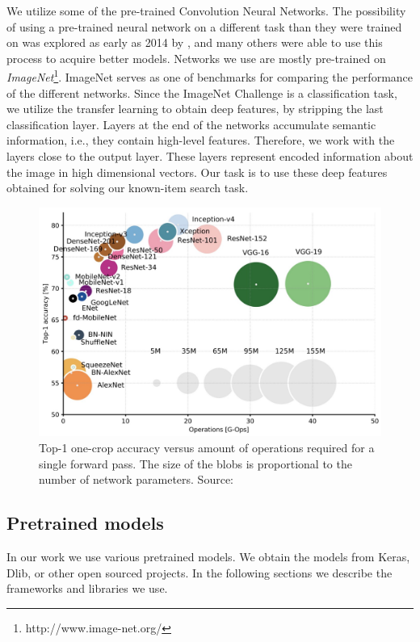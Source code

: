 We utilize some of the pre-trained Convolution Neural Networks. The possibility of using a pre-trained neural network on a different task than they were trained on was explored as early as 2014 by \cite{donahuedeep}, and many others were able to use this process to acquire better models.  Networks we use are mostly pre-trained on \emph{ImageNet}\footnote{http://www.image-net.org/}. ImageNet serves as one of benchmarks for comparing the performance of the different networks. Since the ImageNet Challenge is a classification task, we utilize the transfer learning to obtain deep features, by stripping the last classification layer. Layers at the end of the networks accumulate semantic information, i.e., they contain high-level features. Therefore, we work with the layers close to the output layer. These layers represent encoded information about the image in high dimensional vectors. Our task is to use these deep features obtained for solving our known-item search task.

\begin{figure}
    \centering
	\includegraphics[width=0.8\linewidth]{img/network-comparison.jpeg}
	\caption[Top-1 one-crop accuracy versus amount of operations required for a single forward pass]{Top-1 one-crop accuracy versus amount of operations required for a single forward pass. The size of the blobs is proportional to the number of network parameters. Source: \cite{canziani2016analysis}}
	\label{fig:camera-setup}
\end{figure}

\subsection{Pretrained models}
\label{ss:pretrained_models}

In our work we use various pretrained models. We obtain the models from Keras, Dlib, or other open sourced projects. In the following sections we describe the frameworks and libraries we use.

